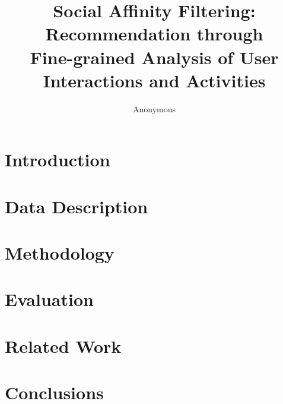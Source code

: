 \documentclass[letterpaper]{article}
\begin{document}
\title{Social Affinity Filtering: Recommendation through \\Fine-grained Analysis of User Interactions and Activities}
\author{Anonymous}

\maketitle

\begin{abstract}

\end{abstract}

\section{Introduction}



\section{Data Description}



\section{Methodology}



\section{Evaluation}



\section{Related Work}

%

\section{Conclusions}

%



\end{document}

